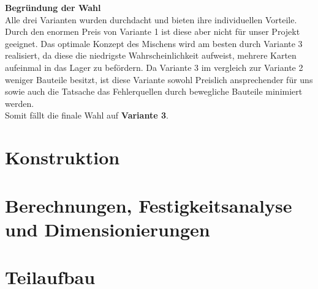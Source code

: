 \begin{table}[H]
\centering
{}
    \caption{Vergleich der Varianten}
\end{table}

\textbf{\large{Begründung der Wahl}}\\
Alle drei Varianten wurden durchdacht und bieten ihre individuellen Vorteile. Durch den enormen Preis von
Variante 1 ist diese aber nicht für unser Projekt geeignet. Das optimale Konzept des Mischens wird am besten durch
Variante 3 realisiert, da diese die niedrigste Wahrscheinlichkeit aufweist, mehrere Karten aufeinmal in das Lager zu befördern.
Da Variante 3 im vergleich zur Variante 2 weniger Bauteile besitzt, ist diese Variante sowohl Preislich ansprechender für uns
 sowie auch die Tatsache das Fehlerquellen durch bewegliche Bauteile minimiert werden. \\
Somit fällt die finale Wahl auf \textbf{Variante 3}.



\pagebreak
\section{Konstruktion}

\section{Berechnungen, Festigkeitsanalyse und Dimensionierungen}

\section{Teilaufbau}